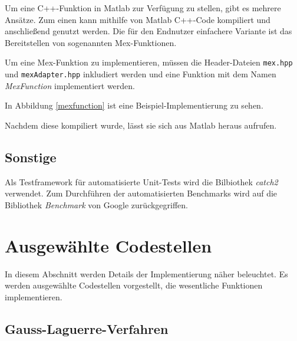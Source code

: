 Um eine C++-Funktion in Matlab zur Verfügung zu stellen, gibt es mehrere Ansätze.
Zum einen kann mithilfe von Matlab C++-Code kompiliert und anschließend genutzt werden. 
Die für den Endnutzer einfachere Variante ist das Bereitstellen von sogenannten Mex-Funktionen.

Um eine Mex-Funktion zu implementieren, müssen die Header-Dateien \texttt{mex.hpp} und \texttt{mexAdapter.hpp} inkludiert werden
und eine Funktion mit dem Namen \textit{MexFunction} implementiert werden. 

In Abbildung \ref{mexfunction} ist eine Beispiel-Implementierung zu sehen.
\begin{center}
    
    \label{mexfunction}
\end{center}

Nachdem diese kompiliert wurde, lässt sie sich aus Matlab heraus aufrufen.


\subsection{Sonstige}

Als Testframework für automatisierte Unit-Tests wird die Bilbiothek \textit{catch2} verwendet.
Zum Durchführen der automatisierten Benchmarks wird auf die Bibliothek \textit{Benchmark} von Google zurückgegriffen.






\section{Ausgewählte Codestellen}

In diesem Abschnitt werden Details der Implementierung näher beleuchtet. Es werden ausgewählte Codestellen vorgestellt, die wesentliche Funktionen implementieren.

\subsection{Gauss-Laguerre-Verfahren}\label{gauss_laguerre_section}

